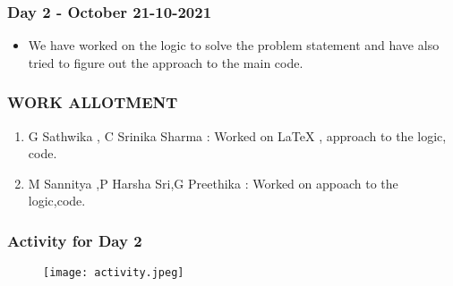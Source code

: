 \documentclass[14pt]{beamer}
\begin{document}
  \begin{frame}
	\frametitle{Day 2 - October 21-10-2021}
        
	\begin{itemize}
	    \item We have worked on the logic to solve the problem statement and have also tried to figure out the approach to the main code. 
	\end{itemize}
	
  \end{frame}
  \begin{frame}
  \frametitle{WORK ALLOTMENT}
    \begin{enumerate}
      \item G Sathwika , C Srinika Sharma : Worked on LaTeX , approach to the logic, code.
      \item M Sannitya ,P Harsha Sri,G Preethika : Worked on appoach to the logic,code.
    \end{enumerate}
  \end{frame}

  \begin{frame}
 \frametitle{Activity for Day 2}
 \begin{figure}
 \texttt{[image: activity.jpeg]}
 \end{figure}
 \end{frame}

 
\end{document}

